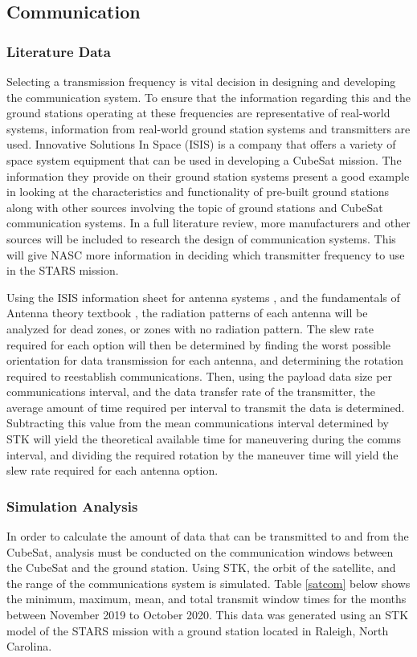 \subsection{Communication}
\subsubsection{Literature Data}
Selecting a transmission frequency is vital decision in designing and developing the communication system. To ensure that the information regarding this and the ground stations operating at these frequencies are representative of real-world systems, information from real-world ground station systems and transmitters are used. Innovative Solutions In Space (ISIS) is a company that offers a variety of space system equipment that can be used in developing a CubeSat mission. The information they provide on their ground station systems \cite{isis_ground}present a good example in looking at the characteristics and functionality of pre-built ground stations along with other sources involving the topic of ground stations and CubeSat communication systems. In a full literature review, more manufacturers and other sources will be included to research the design of communication systems. This will give NASC more information in deciding which transmitter frequency to use in the STARS mission. 

Using the ISIS information sheet for antenna systems \cite{shop}, and the fundamentals of Antenna theory textbook \cite{Wong}, the radiation patterns of each antenna will be analyzed for dead zones, or zones with no radiation pattern. The slew rate required for each option will then be determined by finding the worst possible orientation for data transmission for each antenna, and determining the rotation required to reestablish communications. Then, using the payload data size per communications interval, and the data transfer rate of the transmitter, the average amount of time required per interval to transmit the data is determined. Subtracting this value from the mean communications interval determined by STK will yield the theoretical available time for maneuvering during the comms interval, and dividing the required rotation by the maneuver time will yield the slew rate required for each antenna option.
\subsubsection{Simulation Analysis}
In order to calculate the amount of data that can be transmitted to and from the CubeSat, analysis must be conducted on the communication windows between the CubeSat and the ground station. Using STK, the orbit of the satellite, and the range of the communications system is simulated. Table \ref{satcom} below shows the minimum, maximum, mean, and total transmit window times for the months between November 2019 to October 2020. This data was generated using an STK model of the STARS mission with a ground station located in Raleigh, North Carolina. 

